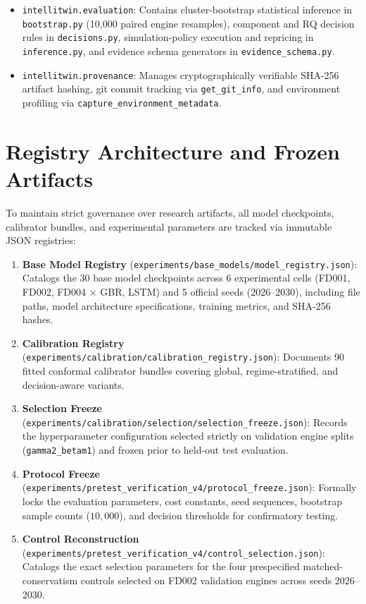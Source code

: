\begin{itemize}
    \item \texttt{intellitwin.evaluation}: Contains cluster-bootstrap statistical inference in \texttt{bootstrap.py} (10,000 paired engine resamples), component and RQ decision rules in \texttt{decisions.py}, simulation-policy execution and repricing in \texttt{inference.py}, and evidence schema generators in \texttt{evidence\_schema.py}.
    \item \texttt{intellitwin.provenance}: Manages cryptographically verifiable SHA-256 artifact hashing, git commit tracking via \texttt{get\_git\_info}, and environment profiling via \texttt{capture\_environment\_metadata}.
\end{itemize}

\section{Registry Architecture and Frozen Artifacts}
To maintain strict governance over research artifacts, all model checkpoints, calibrator bundles, and experimental parameters are tracked via immutable JSON registries:
\begin{enumerate}
    \item \textbf{Base Model Registry} (\texttt{experiments/base\_models/model\_registry.json}): Catalogs the 30 base model checkpoints across 6 experimental cells (FD001, FD002, FD004 $\times$ GBR, LSTM) and 5 official seeds ($2026$--$2030$), including file paths, model architecture specifications, training metrics, and SHA-256 hashes.
    \item \textbf{Calibration Registry} (\texttt{experiments/calibration/calibration\_registry.json}): Documents 90 fitted conformal calibrator bundles covering global, regime-stratified, and decision-aware variants.
    \item \textbf{Selection Freeze} (\texttt{experiments/calibration/selection/selection\_freeze.json}): Records the hyperparameter configuration selected strictly on validation engine splits (\texttt{gamma2\_betam1}) and frozen prior to held-out test evaluation.
    \item \textbf{Protocol Freeze} (\texttt{experiments/pretest\_verification\_v4/protocol\_freeze.json}): Formally locks the evaluation parameters, cost constants, seed sequences, bootstrap sample counts ($10{,}000$), and decision thresholds for confirmatory testing.
    \item \textbf{Control Reconstruction} (\texttt{experiments/pretest\_verification\_v4/control\_selection.json}): Catalogs the exact selection parameters for the four prespecified matched-conservatism controls selected on FD002 validation engines across seeds 2026--2030.
\end{enumerate}


